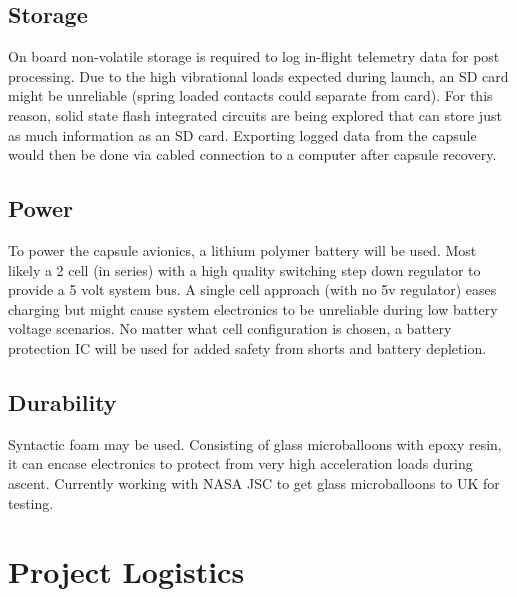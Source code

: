 \documentclass{article}
\begin{document}
\subsection{Storage}
On board non-volatile storage is required to log in-flight telemetry data for post processing. Due to the high vibrational loads expected during launch, an SD card might be unreliable (spring loaded contacts could separate from card). For this reason, solid state flash integrated circuits are being explored that can store just as much information as an SD card. Exporting logged data from the capsule would then be done via cabled connection to a computer after capsule recovery.


\subsection{Power}
To power the capsule avionics, a lithium polymer battery will be used. Most likely a 2 cell (in series) with a high quality switching step down regulator to provide a 5 volt system bus. A single cell approach (with no 5v regulator) eases charging but might cause system electronics to be unreliable during low battery voltage scenarios. No matter what cell configuration is chosen, a battery protection IC will be used for added safety from shorts and battery depletion.


\subsection{Durability}
Syntactic foam may be used. Consisting of glass microballoons with epoxy resin, it can encase electronics to protect from very high acceleration loads during ascent. Currently working with NASA JSC to get glass microballoons to UK for testing.



\section{Project Logistics}
\label{sec:logistics}
\end{document}
